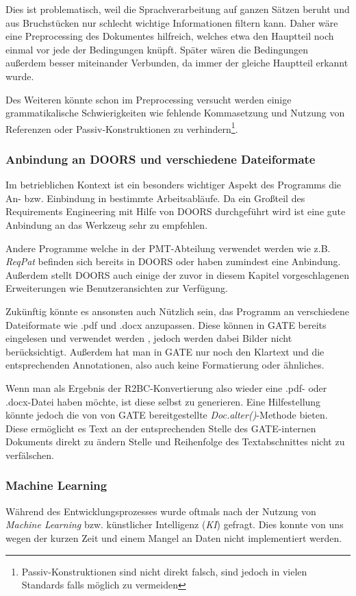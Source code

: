\documentclass[12pt]{report}
\begin{document}
Dies ist problematisch, weil die Sprachverarbeitung auf ganzen Sätzen beruht und aus Bruchstücken nur schlecht wichtige Informationen filtern kann. Daher wäre eine Preprocessing des Dokumentes hilfreich, welches etwa den Hauptteil noch einmal vor jede der Bedingungen knüpft. Später wären die Bedingungen außerdem besser miteinander Verbunden, da immer der gleiche Hauptteil erkannt wurde.

Des Weiteren könnte schon im Preprocessing versucht werden einige grammatikalische Schwierigkeiten wie fehlende Kommasetzung und Nutzung von Referenzen oder Passiv-Konstruktionen zu verhindern\footnote{Passiv-Konstruktionen sind nicht direkt falsch, sind jedoch in vielen Standards falls möglich zu vermeiden}. 
\subsubsection{Anbindung an DOORS und verschiedene Dateiformate}
Im betrieblichen Kontext ist ein besonders wichtiger Aspekt des Programms die An- bzw. Einbindung in bestimmte Arbeitsabläufe. Da ein Großteil des Requirements Engineering mit Hilfe von DOORS durchgeführt wird ist eine gute Anbindung an das Werkzeug sehr zu empfehlen. 

Andere Programme welche in der PMT-Abteilung verwendet werden wie z.B. \textit{ReqPat} befinden sich bereits in DOORS oder haben zumindest eine Anbindung. Außerdem stellt DOORS auch einige der zuvor in diesem Kapitel vorgeschlagenen Erweiterungen wie Benutzeransichten zur Verfügung. 

Zukünftig könnte es ansonsten auch Nützlich sein, das Programm an verschiedene Dateiformate wie .pdf und .docx anzupassen. Diese können in GATE bereits eingelesen und verwendet werden \cite{rs18}, jedoch werden dabei Bilder nicht berücksichtigt. Außerdem hat man in GATE nur noch den Klartext und die entsprechenden Annotationen, also auch keine Formatierung oder ähnliches. 

Wenn man als Ergebnis der R2BC-Konvertierung also wieder eine .pdf- oder .docx-Datei haben möchte, ist diese selbst zu generieren. Eine Hilfestellung könnte jedoch die von von GATE bereitgestellte \textit{Doc.alter()}-Methode bieten. Diese ermöglicht es Text an der entsprechenden Stelle des GATE-internen Dokuments direkt zu ändern Stelle und Reihenfolge des Textabschnittes nicht zu verfälschen.
\subsubsection{Machine Learning}
Während des Entwicklungsprozesses wurde oftmals nach der Nutzung von \textit{Machine Learning} bzw. künstlicher Intelligenz (\textit{KI}) gefragt. Dies konnte von uns wegen der kurzen Zeit und einem Mangel an Daten nicht implementiert werden. 
\end{document}
